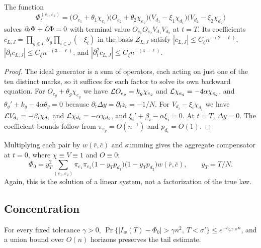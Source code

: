 \begin{lema}[Compensator]\label{lem:compensador} The function \[
 \Phi^{(e_1,e_2)}_t=\bigl(O_{e_1}+\theta_1\chi_{e_1}\bigr)\bigl(O_{e_2}+\theta_2\chi_{e_2}\bigr)
 \bigl(V_{d_1}-\xi_1\chi_{d_1}\bigr)\bigl(V_{d_2}-\xi_2\chi_{d_2}\bigr)
\] solves $\partial_t\Phi+\mathcal{L}\Phi=0$ with terminal value $O_{e_1}O_{e_2}V_{d_1}V_{d_2}$ at $t=T$. Its
coefficients
$c_{L,J}=\prod_{g\notin L}\theta_g\prod_{i\in J}(-\xi_i)$ in the basis $Z_{L,J}$ satisfy
$|c_{L,J}|\le C_\zeta n^{-(2-\ell)}$,
$|\partial_tc_{L,J}|\le C_\zeta n^{-(3-\ell)}$, and $|\partial_t^2c_{L,J}|\le C_\zeta n^{-(4-\ell)}$.
\end{lema}

\begin{proof} The ideal generator is a sum of operators, each acting on just one of the ten distinct marks,
so it suffices for each
factor to solve its own backward equation. For $O_{e_g}+\theta_g\chi_{e_g}$ we have
$\mathcal{L} O_{e_g}=k_g\chi_{e_g}$ and
$\mathcal{L}\chi_{e_g}=-4\alpha\chi_{e_g}$, and $\theta_g'+k_g-4\alpha\theta_g=0$ because
$\partial_t\Delta y=\partial_tz_t=-1/N$. For
$V_{d_i}-\xi_i\chi_{d_i}$ we have $\mathcal{L} V_{d_i}=-\beta_i\chi_{d_i}$ and $\mathcal{L}\chi_{d_i}=-\alpha\chi_{d_i}$,
and
$\xi_i'+\beta_i-\alpha\xi_i=0$. At $t=T$, $\Delta y=0$. The coefficient bounds follow from
$\pi_{e_g}=O(n^{-1})$ and $p_{d_i}=O(1)$.
\end{proof}

Multiplying each pair by $w(\bar r,\bar c)$ and summing gives the aggregate compensator at $t=0$, where
$\chi\equiv
V\equiv1$ and $O\equiv0$: \[
 \Phi_0=y_T^2\sum_{(e_1,e_2)}\pi_{e_1}\pi_{e_2}\bigl(1-y_Tp_{d_1}\bigr)\bigl(1-y_Tp_{d_2}\bigr)
 w(\bar r,\bar c),\qquad y_T=T/N .
\] Again, this is the solution of a linear system, not a factorization of the true law.

\subsection{Concentration}

\begin{lema}\label{lem:conc_inversa} For every fixed tolerance $\gamma>0$,
$\Pr\{|I_w(T)-\Phi_0|>\gamma n^2,\ T<\sigma'\}\le
e^{-c_{\zeta,\gamma,w}n}$, and a union bound over $O(n)$ horizons preserves the tail estimate. \end{lema}

